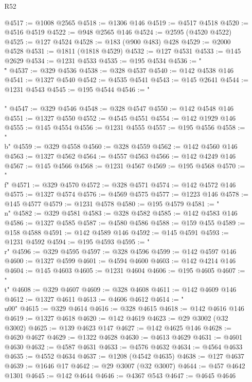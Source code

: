 \begin{lexlean}{R52}
\begin{coremodule}
@4517 := @1008 @2565
@4518 := @1306 @146
@4519 := @4517 @4518
@4520 := @4516 @4519
@4522 := @948 @2565 @146
@4524 := @2595 (@4520 @4522)
@4525 := @127 @4524
@4528 := @183 (@900 @483) @428
@4529 := @2000 @4528
@4531 := @1811 (@1818 @4529)
@4532 := @127 @4531
@4533 := @145 @2629
@4534 := @1231 @4533
@4535 := @195 @4534
@4536 := "\\\""
@4537 := @329 @4536
@4538 := @328 @4537
@4540 := @142 @4538 @146
@4541 := @1327 @4540
@4542 := @4535 @4541
@4543 := @145 @2641
@4544 := @1231 @4543
@4545 := @195 @4544
@4546 := "\\\\"
@4547 := @329 @4546
@4548 := @328 @4547
@4550 := @142 @4548 @146
@4551 := @1327 @4550
@4552 := @4545 @4551
@4554 := @142 @1929 @146
@4555 := @145 @4554
@4556 := @1231 @4555
@4557 := @195 @4556
@4558 := "\\b"
@4559 := @329 @4558
@4560 := @328 @4559
@4562 := @142 @4560 @146
@4563 := @1327 @4562
@4564 := @4557 @4563
@4566 := @142 @4249 @146
@4567 := @145 @4566
@4568 := @1231 @4567
@4569 := @195 @4568
@4570 := "\\f"
@4571 := @329 @4570
@4572 := @328 @4571
@4574 := @142 @4572 @146
@4575 := @1327 @4574
@4576 := @4569 @4575
@4577 := @1223 @146
@4578 := @145 @4577
@4579 := @1231 @4578
@4580 := @195 @4579
@4581 := "\\n"
@4582 := @329 @4581
@4583 := @328 @4582
@4585 := @142 @4583 @146
@4586 := @1327 @4585
@4587 := @4580 @4586
@4588 := @159 @455
@4589 := @158 @4588
@4591 := @142 @4589 @146
@4592 := @145 @4591
@4593 := @1231 @4592
@4594 := @195 @4593
@4595 := "\\r"
@4596 := @329 @4595
@4597 := @328 @4596
@4599 := @142 @4597 @146
@4600 := @1327 @4599
@4601 := @4594 @4600
@4603 := @142 @4214 @146
@4604 := @145 @4603
@4605 := @1231 @4604
@4606 := @195 @4605
@4607 := "\\t"
@4608 := @329 @4607
@4609 := @328 @4608
@4611 := @142 @4609 @146
@4612 := @1327 @4611
@4613 := @4606 @4612
@4614 := "\\u00"
@4615 := @329 @4614
@4616 := @328 @4615
@4618 := @142 @4616 @146
@4619 := @1327 @4618
@4620 := @142 @4619
@4623 := @29 @3002 (@32 @3002)
@4625 := @139 @4623 @147
@4627 := @142 @4625 @146
@4628 := @4620 @4627
@4629 := @1322 @4628
@4630 := @4613 @4629
@4631 := @4601 @4630
@4632 := @4587 @4631
@4633 := @4576 @4632
@4634 := @4564 @4633
@4635 := @4552 @4634
@4637 := @1208 (@4542 @4635)
@4638 := @127 @4637
@4639 := @1646 @17
@4642 := @29 @3007 (@32 @3007)
@4644 := @457 @4642 @1301
@4645 := @142 @4644
@4646 := @4367 @543
@4647 := @4645 @4646

\end{coremodule}
\end{lexlean}
